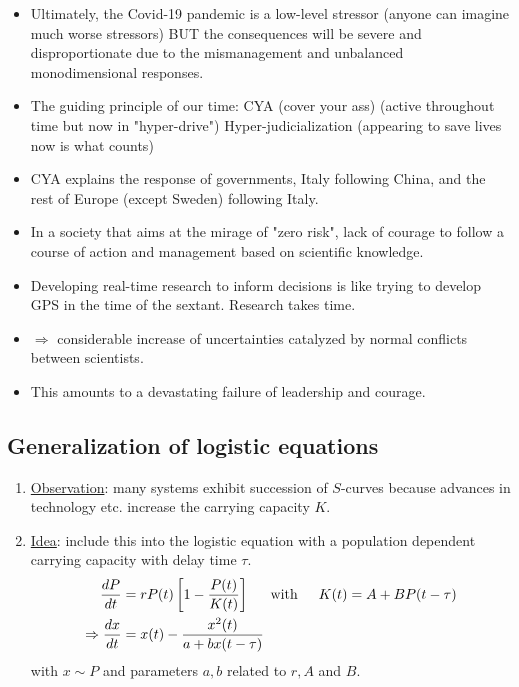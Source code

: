 \begin{itemize}
    \item Ultimately, the Covid-19 pandemic is a low-level stressor (anyone can
        imagine much worse stressors) BUT the consequences will be severe and
        disproportionate due to the mismanagement and unbalanced monodimensional
        responses.
    \item The guiding principle of our time: CYA (cover your ass) (active
        throughout time but now in "hyper-drive") Hyper-judicialization
        (appearing to save lives now is what counts)
    \item CYA explains the response of governments, Italy following China, and
        the rest of Europe (except Sweden) following Italy.
    \item In a society that aims at the mirage of "zero risk", lack of courage
        to follow a course of action and management based on scientific knowledge.
    \item Developing real-time research to inform decisions is like trying to
        develop GPS in the time of the sextant. Research takes time.
    \item $\Rightarrow$ considerable increase of uncertainties catalyzed by normal
        conflicts between scientists.
    \item This amounts to a devastating failure of leadership and courage.
\end{itemize}


\subsection{Generalization of logistic equations}

\begin{enumerate}[]
    \item \underline{Observation}: many systems exhibit succession of $S$-curves
        because advances in technology etc. increase the carrying capacity $K$.
    \item \underline{Idea}: include this into the logistic equation with a
        population dependent carrying capacity with delay time $\tau$.
        \begin{align*}
            \frac{d P}{d t} &= r P(t) \left[ 1 - \frac{P(t)}{K(t)} \right]
            \hspace{15pt} \text{with} \hspace{15pt}
            K(t) = A + B P(t - \tau)
            \\
            \Rightarrow
            \frac{d x}{d t} &= x(t) - \frac{x^2(t)}{a + b x(t - \tau)}
        \end{align*}
        with $x \sim P$ and parameters $a,b$ related to $r,A$ and $B$.
\end{enumerate}

